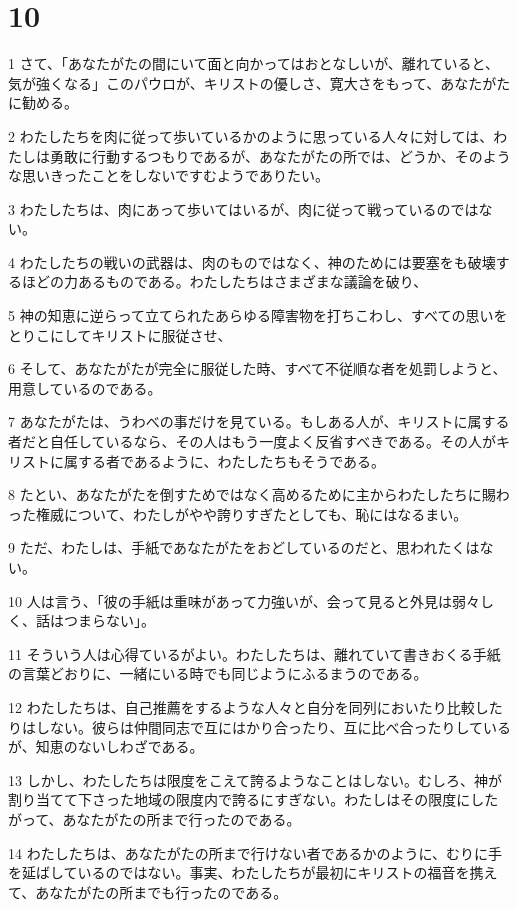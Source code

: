 \chapter{10}

\par 1 さて、「あなたがたの間にいて面と向かってはおとなしいが、離れていると、気が強くなる」このパウロが、キリストの優しさ、寛大さをもって、あなたがたに勧める。
\par 2 わたしたちを肉に従って歩いているかのように思っている人々に対しては、わたしは勇敢に行動するつもりであるが、あなたがたの所では、どうか、そのような思いきったことをしないですむようでありたい。
\par 3 わたしたちは、肉にあって歩いてはいるが、肉に従って戦っているのではない。
\par 4 わたしたちの戦いの武器は、肉のものではなく、神のためには要塞をも破壊するほどの力あるものである。わたしたちはさまざまな議論を破り、
\par 5 神の知恵に逆らって立てられたあらゆる障害物を打ちこわし、すべての思いをとりこにしてキリストに服従させ、
\par 6 そして、あなたがたが完全に服従した時、すべて不従順な者を処罰しようと、用意しているのである。
\par 7 あなたがたは、うわべの事だけを見ている。もしある人が、キリストに属する者だと自任しているなら、その人はもう一度よく反省すべきである。その人がキリストに属する者であるように、わたしたちもそうである。
\par 8 たとい、あなたがたを倒すためではなく高めるために主からわたしたちに賜わった権威について、わたしがやや誇りすぎたとしても、恥にはなるまい。
\par 9 ただ、わたしは、手紙であなたがたをおどしているのだと、思われたくはない。
\par 10 人は言う、「彼の手紙は重味があって力強いが、会って見ると外見は弱々しく、話はつまらない」。
\par 11 そういう人は心得ているがよい。わたしたちは、離れていて書きおくる手紙の言葉どおりに、一緒にいる時でも同じようにふるまうのである。
\par 12 わたしたちは、自己推薦をするような人々と自分を同列においたり比較したりはしない。彼らは仲間同志で互にはかり合ったり、互に比べ合ったりしているが、知恵のないしわざである。
\par 13 しかし、わたしたちは限度をこえて誇るようなことはしない。むしろ、神が割り当てて下さった地域の限度内で誇るにすぎない。わたしはその限度にしたがって、あなたがたの所まで行ったのである。
\par 14 わたしたちは、あなたがたの所まで行けない者であるかのように、むりに手を延ばしているのではない。事実、わたしたちが最初にキリストの福音を携えて、あなたがたの所までも行ったのである。
